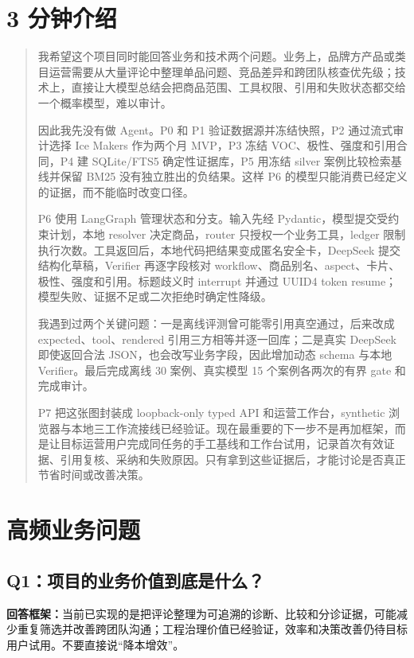 \section{3 分钟介绍}

\begin{quote}
我希望这个项目同时能回答业务和技术两个问题。业务上，品牌方产品或类目运营需要从大量评论中整理单品问题、竞品差异和跨团队核查优先级；技术上，直接让大模型总结会把商品范围、工具权限、引用和失败状态都交给一个概率模型，难以审计。

因此我先没有做 Agent。P0 和 P1 验证数据源并冻结快照，P2 通过流式审计选择 Ice Makers 作为两个月 MVP，P3 冻结 VOC、极性、强度和引用合同，P4 建 SQLite/FTS5 确定性证据库，P5 用冻结 silver 案例比较检索基线并保留 BM25 没有独立胜出的负结果。这样 P6 的模型只能消费已经定义的证据，而不能临时改变口径。

P6 使用 LangGraph 管理状态和分支。输入先经 Pydantic，模型提交受约束计划，本地 resolver 决定商品，router 只授权一个业务工具，ledger 限制执行次数。工具返回后，本地代码把结果变成匿名安全卡，DeepSeek 提交结构化草稿，Verifier 再逐字段核对 workflow、商品别名、aspect、卡片、极性、强度和引用。标题歧义时 interrupt 并通过 UUID4 token resume；模型失败、证据不足或二次拒绝时确定性降级。

我遇到过两个关键问题：一是离线评测曾可能零引用真空通过，后来改成 expected、tool、rendered 引用三方相等并逐一回库；二是真实 DeepSeek 即使返回合法 JSON，也会改写业务字段，因此增加动态 schema 与本地 Verifier。最后完成离线 30 案例、真实模型 15 个案例各两次的有界 gate 和完成审计。

P7 把这张图封装成 loopback-only typed API 和运营工作台，synthetic 浏览器与本地三工作流接线已经验证。现在最重要的下一步不是再加框架，而是让目标运营用户完成同任务的手工基线和工作台试用，记录首次有效证据、引用复核、采纳和失败原因。只有拿到这些证据后，才能讨论是否真正节省时间或改善决策。
\end{quote}

\section{高频业务问题}

\subsection{Q1：项目的业务价值到底是什么？}

\textbf{回答框架：}当前已实现的是把评论整理为可追溯的诊断、比较和分诊证据，可能减少重复筛选并改善跨团队沟通；工程治理价值已经验证，效率和决策改善仍待目标用户试用。不要直接说“降本增效”。

